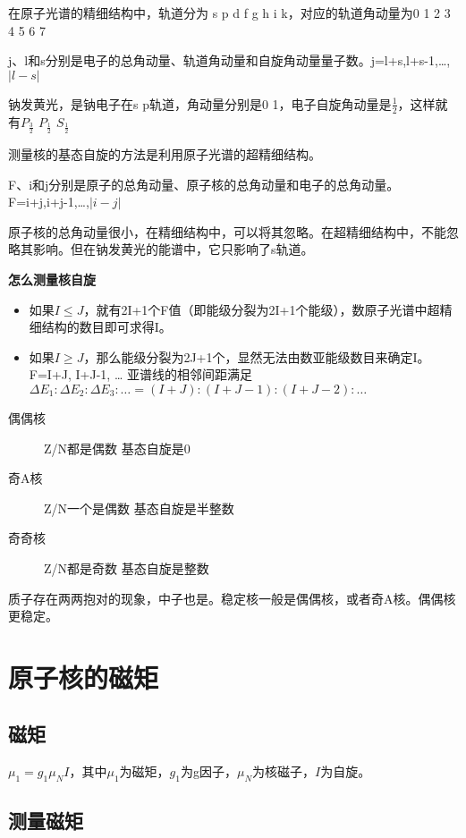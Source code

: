 在原子光谱的精细结构中，轨道分为 s p d f g h i k，对应的轨道角动量为0 1 2 3 4 5 6 7

j、l和s分别是电子的总角动量、轨道角动量和自旋角动量量子数。j=l+s,l+s-1,\dots,$\left\lvert l-s \right\rvert $

钠发黄光，是钠电子在s p轨道，角动量分别是0 1，电子自旋角动量是$\frac{1}{2}$，这样就有$P_{\frac{3}{2}}$ $P_{\frac{1}{2}}$ $S_{\frac{1}{2}}$ 

测量核的基态自旋的方法是利用原子光谱的超精细结构。

F、i和j分别是原子的总角动量、原子核的总角动量和电子的总角动量。F=i+j,i+j-1,\dots,$\left\lvert i-j \right\rvert $

原子核的总角动量很小，在精细结构中，可以将其忽略。在超精细结构中，不能忽略其影响。但在钠发黄光的能谱中，它只影响了s轨道。

\textbf{怎么测量核自旋}

\begin{itemize}
    \item 如果$I\leq J$，就有2I+1个F值（即能级分裂为2I+1个能级），数原子光谱中超精细结构的数目即可求得I。
    \item 如果$I\geq J$，那么能级分裂为2J+1个，显然无法由数亚能级数目来确定I。F=I+J, I+J-1, … 亚谱线的相邻间距满足$\Delta E_1 : \Delta E_2 : \Delta E_3 : \dots = (I+J) : (I+J-1) : (I+J-2) : \dots $
\end{itemize}

\begin{description}
    \item[偶偶核] Z/N都是偶数  基态自旋是0
    \item[奇A核] Z/N一个是偶数 基态自旋是半整数
    \item[奇奇核] Z/N都是奇数  基态自旋是整数
\end{description}

质子存在两两抱对的现象，中子也是。稳定核一般是偶偶核，或者奇A核。偶偶核更稳定。

\section{原子核的磁矩}

\subsection{磁矩}

$\mu _1 = g_1 \mu _N I$，其中$\mu _1$为磁矩，$g_1$为g因子，$\mu _N$为核磁子，$I$为自旋。

\subsection{测量磁矩}

